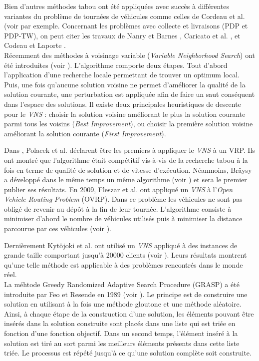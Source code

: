 Bien d'autres méthodes tabou ont été appliquées avec succès à différentes variantes du problème de tournées de véhicules comme celles de Cordeau et al. (voir \cite{Cordeau1997,Cordeau2001} par exemple.
Concernant les problèmes avec collecte et livraisons (PDP et PDP-TW), on peut citer les travaux de Nanry et Barnes \cite{Nanry2000}, Caricato et al. \cite{Caricato2003}, et Codeau et Laporte \cite{Cordeau2003}.\\

Récemment des méthodes à voisinage variable (\textit{Variable Neighborhood Search}) ont été introduites (voir \cite{Mladenovic1997,Hansen2010}). L'algorithme comporte deux étapes. Tout d'abord l'application d'une recherche locale permettant de trouver un optimum local. Puis, une fois qu'aucune solution voisine ne permet d'améliorer la qualité de la solution courante, une perturbation est appliquée afin de faire un saut conséquent dans l'espace des solutions. Il existe deux principales heuristiques de descente pour le \textit{VNS} : choisir la solution voisine améliorant le plus la solution courante parmi tous les voisins (\textit{Best Improvement}), ou choisir la première solution voisine améliorant la solution courante (\textit{First Improvement}).

Dans \cite{Polacek2004}, Polacek et al. déclarent être les premiers à appliquer le \textit{VNS} à un VRP. Ils ont montré que l'algorithme était compétitif vis-à-vis de la recherche tabou à la fois en terme de qualité de solution et de vitesse d'exécution. Néanmoins, Bräysy a développé dans le même temps un même algorithme (voir \cite{Braysy2003}) et sera le premier publier ses résultats. En 2009, Fleszar et al. ont appliqué un \textit{VNS} à l'\textit{Open Vehicle Routing Problem} (OVRP). Dans ce problème les véhicules ne sont pas obligé de revenir au dépôt à la fin de leur tournée. L'algorithme consiste à minimiser d'abord le nombre de véhicules utilisés puis à minimiser la distance parcourue par ces véhicules (voir \cite{Fleszar2009}).

Dernièrement Kytöjoki et al. ont utilisé un \textit{VNS} appliqué à des instances de grande taille comportant jusqu'à 20000 clients (voir \cite{Kytojoki2007}). Leurs résultats montrent qu'une telle méthode est applicable à des problèmes rencontrés dans le monde réel.\\

La méhtode Greedy Randomized Adaptive Search Procedure (GRASP) a été introduite par Feo et Resende en 1989 (voir \cite{Feo1989}). 
Le principe est de construire une solution en utilisant à la fois une méthode gloutone et une méthode aléatoire. Ainsi, à chaque étape de la construction d'une solution, les éléments pouvant être insérés dans la solution construite sont placés dans une liste qui est triée en fonction d'une fonction objectif. Dans un second temps, l'élément inséré à la solution est tiré au sort parmi les meilleurs éléments présents dans cette liste triée. Le processus est répété jusqu'à ce qu'une solution complète soit construite.\\

